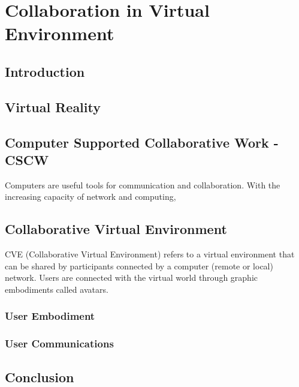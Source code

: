 \chapter{Collaboration in Virtual Environment}
\label{chapter:context}
\minitoc


\section{Introduction}

\section{Virtual Reality}

\section{Computer Supported Collaborative Work - CSCW}
Computers are useful tools for communication and collaboration. With the increasing capacity of network and computing, 

\section{Collaborative Virtual Environment}
CVE (Collaborative Virtual Environment) refers to a virtual environment that can be shared by participants connected by a computer (remote or local) network. Users are connected with the virtual world through graphic embodiments called avatars.

\subsection{User Embodiment}

\subsection{User Communications}



\section{Conclusion}

